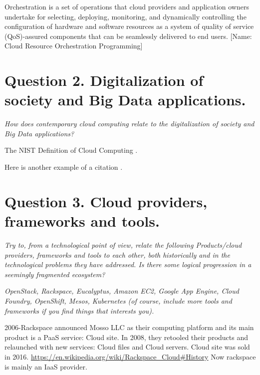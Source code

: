 \documentclass[a4paper,12pt]{article}
\begin{document}
Orchestration is a set of operations that cloud providers and application owners undertake for selecting, deploying, monitoring, and dynamically controlling the configuration of hardware and software resources as a system of quality of service (QoS)-assured components that can be seamlessly delivered to end users. [Name: Cloud Resource Orchestration Programming]







\newpage
\section{Question 2. Digitalization of society and Big Data applications.}
\textit{How does contemporary cloud computing relate to the digitalization of society
and Big Data applications?}

The NIST Definition of Cloud Computing \cite{nist}.

Here is another example of a citation \cite{fog}.


\newpage
\section{Question 3. Cloud providers, frameworks and tools.}
\textit{Try to, from a technological point of view, relate the following Products/cloud
providers, frameworks and tools to each other, both historically and in the
technological problems they have addressed. Is there some logical progression in a
seemingly fragmented ecosystem?}

\textit{OpenStack, Rackspace, Eucalyptus, Amazon EC2, Google App Engine, Cloud
Foundry, OpenShift, Mesos, Kubernetes (of course, include more tools and frameworks
if you find things that interests you).}

2006-Rackspace announced Mosso LLC as their computing platform and its main product is a PaaS service: Cloud site. In 2008, they retooled their products and relaunched with new services: Cloud files and Cloud servers. Cloud site was sold in 2016. \url{https://en.wikipedia.org/wiki/Rackspace_Cloud#History} Now rackspace is mainly an IaaS provider. 
\end{document}
